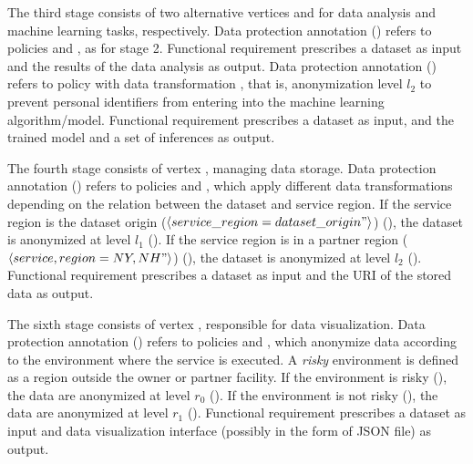 The third stage consists of two alternative vertices  and  for data analysis and machine learning tasks, respectively.
Data protection annotation \myLambda() refers to policies  and , as for stage 2. 
Functional requirement  prescribes a dataset as input and the results of the data analysis as output.
Data protection annotation \myLambda() refers to policy  with data transformation , that is, anonymization level $l_2$ to prevent personal identifiers from entering into the machine learning algorithm/model.
Functional requirement  prescribes a dataset as input, and the trained model and a set of inferences as output.

The fourth stage consists of vertex , managing data storage. Data protection annotation \myLambda() refers to policies  and , which apply different data transformations depending on the relation between the dataset and service region. If the service region is the dataset origin ($\langle service\_region=dataset\_origin"\rangle$) (), the dataset is anonymized at level $l_1$ ().
If the service region is in a partner region ($\langle service,region={NY,NH}"\rangle$) (), the dataset is anonymized at level $l_2$ ().
Functional requirement  prescribes a dataset as input and the URI of the stored data as output.

The sixth stage consists of vertex , responsible for data visualization. Data protection annotation \myLambda() refers to policies  and , which anonymize data according to the environment where the service is executed.
A \emph{risky} environment is defined as a region outside the owner or partner facility.
If the environment is risky (), the data are anonymized at level $r_0$ ().
If the environment is not risky (), the data are anonymized at level $r_1$ ().
Functional requirement  prescribes a dataset as input and data visualization interface (possibly in the form of JSON file) as output.

